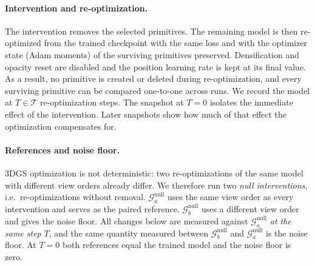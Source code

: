 \paragraph{Intervention and re-optimization.}
The intervention removes the selected primitives. The remaining model is then re-optimized from the
trained checkpoint with the same loss and with the optimizer state (Adam moments) of the
surviving primitives preserved. Densification and opacity reset are disabled and the position
learning rate is kept at its final value. As a result, no primitive is created or deleted during
re-optimization, and every surviving primitive can be compared one-to-one across runs. We record the
model at $T\in\mathcal{T}$ re-optimization steps. The snapshot at $T=0$ isolates the immediate effect
of the intervention. Later snapshots show how much of that effect the optimization compensates for.

\paragraph{References and noise floor.}
3DGS optimization is not deterministic: two re-optimizations of the same model with different view
orders already differ. We therefore run two \emph{null interventions}, i.e.\ re-optimizations without
removal. $\mathcal{G}^{\mathrm{null}}_a$ uses the same view order as every intervention and serves as
the paired reference. $\mathcal{G}^{\mathrm{null}}_b$ uses a different view order and gives the noise
floor. All changes below are measured against $\mathcal{G}^{\mathrm{null}}_a$ \emph{at the same step}
$T$, and the same quantity measured between $\mathcal{G}^{\mathrm{null}}_b$ and
$\mathcal{G}^{\mathrm{null}}_a$ is the noise floor. At $T=0$ both references equal the trained model
and the noise floor is zero.

